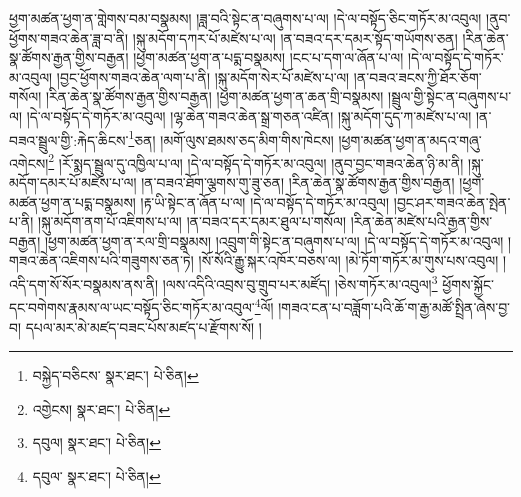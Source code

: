 ཕྱག་མཚན་ཕྱག་ན་གླེགས་བམ་བསྣམས། །ཟླ་བའི་སྟེང་ན་བཞུགས་པ་ལ། །དེ་ལ་བསྟོད་ཅིང་གཏོར་མ་འབུལ། །ནུབ་ཕྱོགས་གཟའ་ཆེན་ཟླ་བ་ནི། །སྐུ་མདོག་དཀར་པོ་མཛེས་པ་ལ། །ན་བཟའ་དར་དམར་སྟོད་གཡོགས་ཅན། །རིན་ཆེན་སྣ་ཚོགས་རྒྱན་གྱིས་བརྒྱན། །ཕྱག་མཚན་ཕྱག་ན་པདྨ་བསྣམས། །ངང་པ་དག་ལ་ཞོན་པ་ལ། །དེ་ལ་བསྟོད་དེ་གཏོར་མ་འབུལ། །བྱང་ཕྱོགས་གཟའ་ཆེན་ལག་པ་ནི། །སྐུ་མདོག་སེར་པོ་མཛེས་པ་ལ། །ན་བཟའ་ཟངས་ཀྱི་ཐོར་ཅོག་གསོལ། །རིན་ཆེན་སྣ་ཚོགས་རྒྱན་གྱིས་བརྒྱན། །ཕྱག་མཚན་ཕྱག་ན་ཆན་གྲི་བསྣམས། །སྦྲུལ་གྱི་སྟེང་ན་བཞུགས་པ་ལ། །དེ་ལ་བསྟོད་དེ་གཏོར་མ་འབུལ། །ལྷ་ཆེན་གཟའ་ཆེན་སྒྲ་གཅན་འཛིན། །སྐུ་མདོག་དུད་ཀ་མཛེས་པ་ལ། །ན་བཟའ་སྦྲུལ་གྱི་:རྐེད་ཆིངས་\footnote{བསྐྱེད་བཅིངས་  སྣར་ཐང་།  པེ་ཅིན། }ཅན། །མགོ་ལུས་ཐམས་ཅད་མིག་གིས་ཁེངས། །ཕྱག་མཚན་ཕྱག་ན་མདའ་གཞུ་འགེངས།\footnote{འགྱེངས།  སྣར་ཐང་།  པེ་ཅིན། } །རོ་སྨད་སྦྲུལ་དུ་འཁྱིལ་པ་ལ། །དེ་ལ་བསྟོད་དེ་གཏོར་མ་འབུལ། །ནུབ་བྱང་གཟའ་ཆེན་ཉི་མ་ནི། །སྐུ་མདོག་དམར་པོ་མཛེས་པ་ལ། །ན་བཟའ་ཐོག་ལྕགས་གུ་ཟུ་ཅན། །རིན་ཆེན་སྣ་ཚོགས་རྒྱན་གྱིས་བརྒྱན། །ཕྱག་མཚན་ཕྱག་ན་པདྨ་བསྣམས། །རྟ་ཡི་སྟེང་ན་ཞོན་པ་ལ། །དེ་ལ་བསྟོད་དེ་གཏོར་མ་འབུལ། །བྱང་ཤར་གཟའ་ཆེན་སྤེན་པ་ནི། །སྐུ་མདོག་ནག་པོ་འཇིགས་པ་ལ། །ན་བཟའ་དར་དམར་ཐུལ་པ་གསོལ། །རིན་ཆེན་མཛེས་པའི་རྒྱན་གྱིས་བརྒྱན། །ཕྱག་མཚན་ཕྱག་ན་རལ་གྲི་བསྣམས། །འབྲུག་གི་སྟེང་ན་བཞུགས་པ་ལ། །དེ་ལ་བསྟོད་དེ་གཏོར་མ་འབུལ། །གཟའ་ཆེན་འཇིགས་པའི་གཟུགས་ཅན་ཏེ། །སོ་སོའི་རྒྱུ་སྐར་འཁོར་བཅས་ལ། །མེ་ཏོག་གཏོར་མ་གུས་པས་འབུལ། །འདི་དག་སོ་སོར་བསྣམས་ནས་ནི། །ལས་འདིའི་འབྲས་བུ་གྲུབ་པར་མཛོད། །ཅེས་གཏོར་མ་འབུལ།\footnote{དབུལ།  སྣར་ཐང་།  པེ་ཅིན། } ཕྱོགས་སྐྱོང་དང་བགེགས་རྣམས་ལ་ཡང་བསྟོད་ཅིང་གཏོར་མ་འབུལ་\footnote{དབུལ་  སྣར་ཐང་།  པེ་ཅིན། }ལོ། །གཟའ་ངན་པ་བཟློག་པའི་ཆོ་ག་རྒྱ་མཚོ་སྤྲིན་ཞེས་བྱ་བ། དཔལ་མར་མེ་མཛད་བཟང་པོས་མཛད་པ་རྫོགས་སོ། ། 